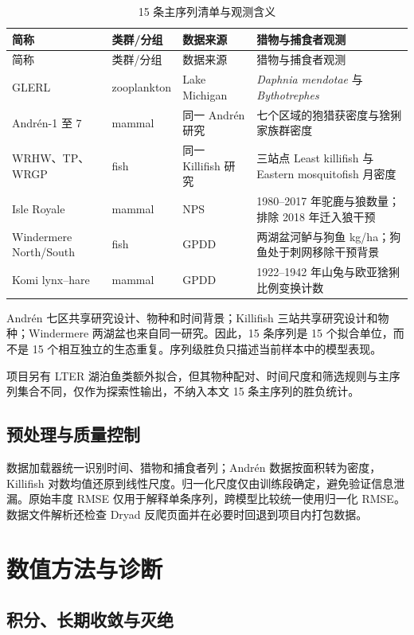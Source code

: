 \documentclass[12pt,a4paper]{ctexart}
\begin{document}
\begin{longtable}{p{}p{}p{}p{}}
 \caption{15 条主序列清单与观测含义}\label{tab:datasets}\\
 \toprule
 简称 & 类群/分组 & 数据来源 & 猎物与捕食者观测\\
 \midrule
 \endfirsthead
 \toprule
 简称 & 类群/分组 & 数据来源 & 猎物与捕食者观测\\
 \midrule
 \endhead
 GLERL & zooplankton & Lake Michigan & \emph{Daphnia mendotae} 与 \emph{Bythotrephes}\\
 Andrén-1 至 7 & mammal & 同一 Andrén 研究 & 七个区域的狍猎获密度与猞猁家族群密度\\
 WRHW、TP、WRGP & fish & 同一 Killifish 研究 & 三站点 Least killifish 与 Eastern mosquitofish 月密度\\
 Isle Royale & mammal & NPS & 1980--2017 年驼鹿与狼数量；排除 2018 年迁入狼干预\\
 Windermere North/South & fish & GPDD & 两湖盆河鲈与狗鱼 kg/ha；狗鱼处于刺网移除干预背景\\
 Komi lynx--hare & mammal & GPDD & 1922--1942 年山兔与欧亚猞猁比例变换计数\\
 \bottomrule
\end{longtable}

Andrén 七区共享研究设计、物种和时间背景；Killifish 三站共享研究设计和物种；Windermere 两湖盆也来自同一研究。因此，15 条序列是 15 个拟合单位，而不是 15 个相互独立的生态重复。序列级胜负只描述当前样本中的模型表现。

项目另有 LTER 湖泊鱼类额外拟合，但其物种配对、时间尺度和筛选规则与主序列集合不同，仅作为探索性输出，不纳入本文 15 条主序列的胜负统计。

\subsection{预处理与质量控制}

数据加载器统一识别时间、猎物和捕食者列；Andrén 数据按面积转为密度，Killifish 对数均值还原到线性尺度。归一化尺度仅由训练段确定，避免验证信息泄漏。原始丰度 RMSE 仅用于解释单条序列，跨模型比较统一使用归一化 RMSE。数据文件解析还检查 Dryad 反爬页面并在必要时回退到项目内打包数据。

\section{数值方法与诊断}

\subsection{积分、长期收敛与灭绝}
\end{document}
